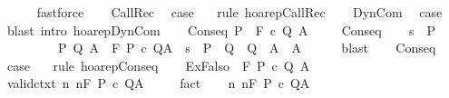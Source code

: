 \begin{isabellebody}
\ \ \ \ \isamarkupfalse%
\ fastforce\isanewline
\isanewline
\ \ \isamarkupfalse%
\ CallRec\ \isamarkupfalse%
\ {\isacharquery}case\ \isamarkupfalse%
\ {\isacharminus}\ {\isacharparenleft}rule\ hoarep{\isachardot}CallRec{\isacharparenright}\isanewline
{}\isamarkupfalse%
\isanewline
\ \ \isamarkupfalse%
\ DynCom\ \isamarkupfalse%
\ {\isacharquery}case\ \isamarkupfalse%
\ {\isacharparenleft}blast\ intro{\isacharcolon}\ hoarep{\isachardot}DynCom{\isacharparenright}\isanewline
{}\isamarkupfalse%
\isanewline
\ \ \isamarkupfalse%
\ {\isacharparenleft}Conseq\ P\ {\isasymTheta}\ F\ c\ Q\ A\ {\isasymTheta}{\isacharprime}{\isacharparenright}\isanewline
\ \ \isamarkupfalse%
\ Conseq\isanewline
\ \ \isamarkupfalse%
\ {\isachardoublequoteopen}{\isasymforall}s\ {\isasymin}\ P{\isachardot}\ \isanewline
\ \ \ \ \ \ \ \ \ {\isacharparenleft}{\isasymexists}P{\isacharprime}\ Q{\isacharprime}\ A{\isacharprime}{\isachardot}\ {\isasymGamma}{\isacharcomma}{\isasymTheta}{\isacharprime}\ {\isasymturnstile}\isactrlbsub {\isacharslash}F\isactrlesub \ P{\isacharprime}\ c\ Q{\isacharprime}{\isacharcomma}A{\isacharprime}\ {\isasymand}\ s\ {\isasymin}\ P{\isacharprime}\ {\isasymand}\ Q{\isacharprime}\ {\isasymsubseteq}\ Q\ {\isasymand}\ A{\isacharprime}\ {\isasymsubseteq}\ A{\isacharparenright}{\isachardoublequoteclose}\isanewline
\ \ \ \ \isamarkupfalse%
\ blast\isanewline
\ \ \isamarkupfalse%
\ Conseq\ \isamarkupfalse%
\ {\isacharquery}case\ \isamarkupfalse%
\ {\isacharminus}\ {\isacharparenleft}rule\ hoarep{\isachardot}Conseq{\isacharparenright}\isanewline
{}\isamarkupfalse%
\isanewline
\ \ \isamarkupfalse%
\ {\isacharparenleft}ExFalso\ {\isasymTheta}\ F\ P\ c\ Q\ A\ {\isasymTheta}{\isacharprime}{\isacharparenright}\isanewline
\ \ \isamarkupfalse%
\ valid{\isacharunderscore}ctxt{\isacharcolon}\ {\isachardoublequoteopen}{\isasymforall}n{\isachardot}\ {\isasymGamma}{\isacharcomma}{\isasymTheta}{\isasymTurnstile}n{\isacharcolon}\isactrlbsub {\isacharslash}F\isactrlesub \ P\ c\ Q{\isacharcomma}A{\isachardoublequoteclose}\ {\isachardoublequoteopen}{\isasymTheta}\ {\isasymsubseteq}\ {\isasymTheta}{\isacharprime}{\isachardoublequoteclose}\ \isamarkupfalse%
\ fact{\isacharplus}\isanewline
\ \ \isamarkupfalse%
\ {\isachardoublequoteopen}{\isasymforall}n{\isachardot}\ {\isasymGamma}{\isacharcomma}{\isasymTheta}{\isacharprime}{\isasymTurnstile}n{\isacharcolon}\isactrlbsub {\isacharslash}F\isactrlesub \ P\ c\ Q{\isacharcomma}A{\isachardoublequoteclose}\isanewline

\end{isabellebody}
